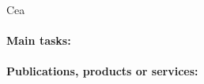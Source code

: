 \begin{sitedescription}{Cea}
\paragraph*{Main tasks:}






\begin{compactitem}
\item{}
\end{compactitem}

\paragraph*{Publications, products or services:}



\end{sitedescription}
